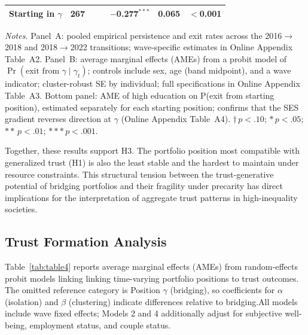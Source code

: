\begin{table}[htbp]
{\begin{tabular}{lrccccc}
\quad Starting in $\gamma$  &   267 & & & $-$0.277$^{***}$& 0.065 & $<$0.001 \\
\hline\hline
\end{tabular}%
}
\begin{minipage}{\textwidth}
  \vspace{5pt}
  \footnotesize
  \textit{Notes.} Panel~A: pooled empirical persistence and exit rates across
  the 2016$\to$2018 and 2018$\to$2022 transitions; wave-specific estimates in
  Online Appendix Table~A2. Panel~B: average marginal effects (AMEs) from a
  probit model of $\Pr(\text{exit from } \gamma \mid \gamma_t)$; controls
  include sex, age (band midpoint), and a wave indicator; cluster-robust SE
  by individual; full specifications in Online Appendix Table~A3. Bottom
  panel: AME of high education on P(exit from starting position), estimated
  separately for each starting position; confirms that the SES gradient
  reverses direction at $\gamma$ (Online Appendix Table~A4).
  $\dagger\,p < .10$; $*\,p < .05$; $**\,p < .01$; $***\,p < .001$.
\end{minipage}
\end{table}

Together, these results support H3. The portfolio position most compatible with generalized trust (H1) is also the least stable and the hardest to maintain under resource constraints. This structural tension between the trust-generative potential of bridging portfolios and their fragility under precarity has direct implications for the interpretation of aggregate trust patterns in high-inequality societies.

\subsection{Trust Formation Analysis}


Table~\ref{tab:table4} reports average marginal effects (AMEs) from random-effects probit models linking linking time-varying portfolio positions to trust outcomes. The omitted reference category is Position $\gamma$ (bridging), so coefficients for $\alpha$ (isolation) and $\beta$ (clustering) indicate differences relative to bridging.All models include wave fixed effects; Models 2 and 4 additionally adjust for subjective well-being, employment status, and couple status.

